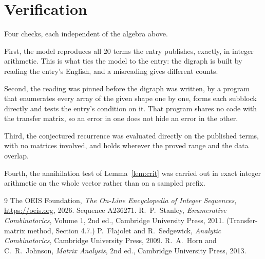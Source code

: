 \documentclass[11pt,a4paper]{article}
\theoremstyle{plain}
\theoremstyle{definition}
\begin{document}
\section{Verification}

Four checks, each independent of the algebra above.

First, the model reproduces all $20$ terms the entry publishes, exactly, in integer
arithmetic. This is what ties the model to the entry: the digraph is built by reading the
entry's English, and a misreading gives different counts.

Second, the reading was pinned before the digraph was written, by a program that enumerates
every array of the given shape one by one, forms each subblock directly and tests the entry's
condition on it. That program shares no code with the transfer matrix, so an error in one does
not hide an error in the other.

Third, the conjectured recurrence was evaluated directly on the published terms, with no
matrices involved, and holds wherever the proved range and the data overlap.

Fourth, the annihilation test of Lemma~\ref{lem:crit} was carried out in exact integer
arithmetic on the whole vector rather than on a sampled prefix.

\begin{thebibliography}{9}
 The OEIS Foundation, \emph{The On-Line Encyclopedia of Integer
Sequences}, \url{https://oeis.org}, 2026. Sequence A236271.
 R.~P.~Stanley, \emph{Enumerative Combinatorics}, Volume 1, 2nd ed.,
Cambridge University Press, 2011. (Transfer-matrix method, Section 4.7.)
 P.~Flajolet and R.~Sedgewick, \emph{Analytic Combinatorics}, Cambridge
University Press, 2009.
 R.~A.~Horn and C.~R.~Johnson, \emph{Matrix Analysis}, 2nd ed., Cambridge
University Press, 2013.
\end{thebibliography}
\end{document}

